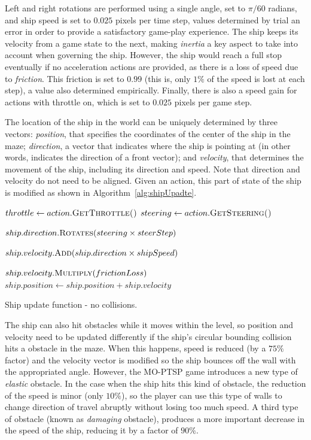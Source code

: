 \documentclass[conference]{IEEEtran}
\begin{document}
Left and right rotations are performed using a single angle, set to $\pi/60$ radians, and ship speed is set to $0.025$ pixels per time step, values determined by trial an error in order to provide a satisfactory game-play experience. The ship keeps its velocity from a game state to the next, making \textit{inertia} a key aspect to take into account when governing the ship. However, the ship would reach a full stop eventually if no acceleration actions are provided, as there is a loss of speed due to \textit{friction}. This friction is  set to $0.99$ (this is, only $1\%$ of the speed is lost at each step), a value also determined empirically. Finally, there is also a speed gain for actions with throttle on, which is set to $0.025$ pixels per game step. 

The location of the ship in the world can be uniquely determined by three vectors: \textit{position}, that specifies the coordinates of the center of the ship in the maze; \textit{direction}, a vector that indicates where the ship is pointing at (in other words, indicates the direction of a front vector); and \textit{velocity}, that determines the movement of the ship, including its direction and speed. Note that direction and velocity do not need to be aligned. Given an action, this part of state of the ship is modified as shown in Algorithm~\ref{alg:shipUpadte}.

\begin{algorithm}[!h]
\begin{algorithmic}
	\State $throttle \gets action.\Call{GetThrottle()}{}$
	\State $steering \gets action.\Call{GetSteering()}{}$

	\State $ship.direction.\Call{Rotates}{steering \times steerStep}$

		\State $ship.velocity.\Call{Add}{ship.direction \times shipSpeed}$
	\EndIf

	\State $ship.velocity.\Call{Multiply}{frictionLoss}$
	\State $ship.position \gets ship.position + ship.velocity$


\EndFunction
\end{algorithmic}
\caption{Ship update function - no collisions.}
\label{alg:shipUpadte}
\end{algorithm}

The ship can also hit obstacles while it moves within the level, so position and velocity need to be updated differently if the ship's circular bounding collision hits a obstacle in the maze. When this happens, speed is reduced (by a $75\%$ factor) and the velocity vector is modified so the ship bounces off the wall with the appropriated angle. However, the MO-PTSP game introduces a new type of \textit{elastic} obstacle. In the case when the ship hits this kind of obstacle, the reduction of the speed is minor (only $10\%$), so the player can use this type of walls to change direction of travel abruptly without losing too much speed. A third type of obstacle (known as \textit{damaging} obstacle), produces a more important decrease in the speed of the ship, reducing it by a factor of $90\%$.
\end{document}

